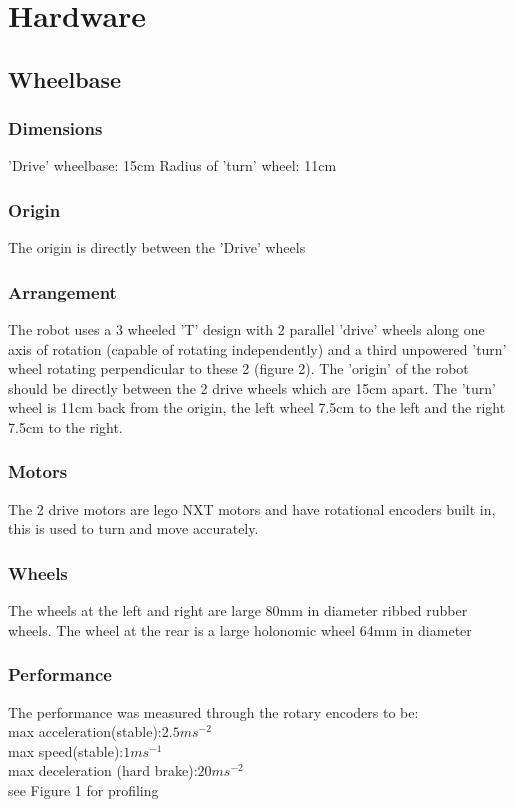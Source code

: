 \section{Hardware}

\subsection{Wheelbase}
\subsubsection{Dimensions}
'Drive' wheelbase:		15cm \newline
Radius of 'turn' wheel: 11cm
\subsubsection{Origin}
The origin is directly between the 'Drive' wheels
\subsubsection{Arrangement}
The robot uses a 3 wheeled 'T' design with 2 parallel 'drive' wheels along one axis of rotation (capable of rotating independently) and a third unpowered 'turn' wheel rotating perpendicular to these 2 (figure 2). The 'origin' of the robot should be 
directly between the 2 drive wheels which are 15cm apart. The 'turn' wheel 
is 11cm back from the origin, the left wheel 7.5cm to the left and the right
7.5cm to the right. 

\subsubsection{Motors}
The 2 drive motors are lego NXT motors and have rotational encoders built in, this is used to turn and move accurately. 
\subsubsection{Wheels}
The wheels at the left and right are large 80mm in diameter ribbed rubber wheels. The wheel at the rear is a large holonomic wheel 64mm in diameter
\subsubsection{Performance}
The performance was measured through the rotary encoders to be:\\
max acceleration(stable):$2.5ms^{-2}$\\
max speed(stable):$1ms^{-1}$ \\
max deceleration (hard brake):$20ms^{-2}$\\
see Figure 1 for profiling\\

